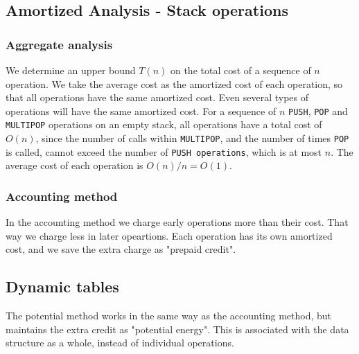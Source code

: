 \subsection*{Amortized Analysis - Stack operations}
\subsubsection*{Aggregate analysis}
We determine an upper bound $T(n)$ on the total cost of a sequence of $n$
operation. We take the average cost as the amortized cost of each operation, so
that all operations have the same amortized cost. Even several types of
operations will have the same amortized cost.
\newline\newline
For a sequence of $n$ \texttt{PUSH}, \texttt{POP} and \texttt{MULTIPOP}
operations on an empty stack, all operations have a total cost of $O(n)$, since
the number of calls within \texttt{MULTIPOP}, and the number of times
\texttt{POP} is called, cannot exceed the number of \texttt{PUSH operations},
which is at most $n$. The average cost of each operation is $O(n)/n=O(1)$.

\subsubsection*{Accounting method}
In the accounting method we charge early operations more than their cost. That
way we charge less in later opeartions. Each operation has its own amortized
cost, and we save the extra charge as "prepaid credit".
\newline\newline

\subsection*{Dynamic tables}
The potential method works in the same way as the accounting method, but
maintains the extra credit as "potential energy". This is associated with the
data structure as a whole, instead of individual operations.
\newline\newline
